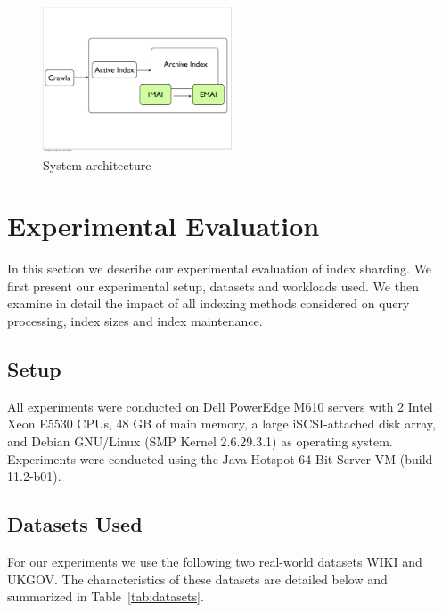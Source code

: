 \begin{figure}[tb]
  	\centering
	\includegraphics[width=0.5\textwidth]{resources/system_arch_incsh.pdf}
   	\caption{System architecture}
		  \label{fig:archive_indexing_system}	
\end{figure}


\section{Experimental Evaluation}
\label{chap:sharding:sec:eval}

In this section we describe our experimental evaluation of index sharding. We first present our experimental setup, datasets and workloads used. We then examine in detail the impact of all indexing methods considered on query processing, index sizes and index maintenance. 

\subsection {Setup}
 All experiments were conducted on Dell
PowerEdge M610 servers with 2 Intel Xeon E5530 CPUs, 48 GB of main
memory, a large iSCSI-attached disk array, and Debian GNU/Linux (SMP
Kernel 2.6.29.3.1) as operating system. Experiments were conducted
using the Java Hotspot 64-Bit Server VM (build 11.2-b01). 

\subsection{Datasets Used}
For our experiments we use the following two real-world datasets WIKI and UKGOV. The characteristics of these datasets are detailed below and summarized in Table~\ref{tab:datasets}.

